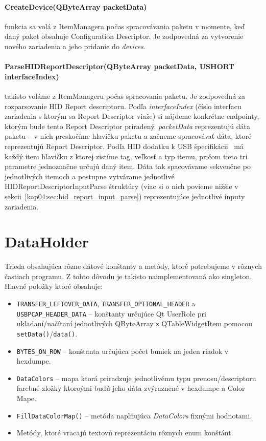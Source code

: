 \paragraph{CreateDevice(QByteArray packetData)} funkcia sa volá z ItemManagera počas spracovávania paketu v momente, keď daný paket obsahuje Configuration Descriptor. Je zodpovedná za vytvorenie nového zariadenia a jeho pridanie do \textit{devices}.

\paragraph{ParseHIDReportDescriptor(QByteArray packetData, USHORT interfaceIndex)} \label{kap04:sec:parse_hid} takisto voláme z ItemManageru počas spracovania paketu. Je zodpovedná za rozparsovanie HID Report descriptoru. Podľa \textit{interfaceIndex} (číslo interfacu zariadenia s ktorým sa Report Descriptor viaže) si nájdeme konkrétne endpointy, ktorým bude tento Report Descriptor priradený. \textit{packetData} reprezentujú dáta paketu -- v nich preskočíme hlavičku paketu a začneme spracovávať dáta, ktoré reprezentujú Report Descriptor. Podľa HID dodatku k USB špecifikácii~\cite{usbhid} má každý item hlavičku z ktorej zistíme tag, veľkosť a typ itemu, pričom tieto tri parametre jednoznačne určujú daný item. Dáta tak spacovávame sekvenčne po jednotlivých itemoch a postupne vytvárame jednotlivé HIDReportDescriptorInputParse štruktúry (viac si o nich povieme nižšie v sekcii~\ref{kap04:sec:hid_report_input_parse}) reprezentujúce jednotlivé inputy zariadenia.

\section{DataHolder}
\label{kap04:sec:data_holder}
Trieda obsahujúca rôzne dátové konštanty a metódy, ktoré potrebujeme v rôznych častiach programu. Z tohto dôvodu je takisto naimplementovaná ako singleton. Hlavné položky ktoré obsahuje:
\begin{itemize}
\item \texttt{TRANSFER\_LEFTOVER\_DATA}, \texttt{TRANSFER\_OPTIONAL\_HEADER} a \newline \texttt{USBPCAP\_HEADER\_DATA} -- konštanty určujúce Qt UserRole pri ukladaní/\newline načítaní jednotlivých QByteArray z QTableWidgetItem pomocou \newline \texttt{setData()}/\texttt{data()}.
\item \texttt{BYTES\_ON\_ROW} -- konštanta určujúca počet buniek na jeden riadok v hexdumpe.
\item \texttt{DataColors} -- mapa ktorá priradzuje jednotlivému typu prenosu/descripto\-ru farebné zložky ktoroými budú jeho dáta zvýraznené v hexdumpe a Color Mape.
\item \texttt{FillDataColorMap()} -- metóda naplňujúca \textit{DataColors} fixnými hodnotami.
\item Metódy, ktoré vracajú textovú reprezentáciu rôznych enum konštánt.
\end{itemize}

